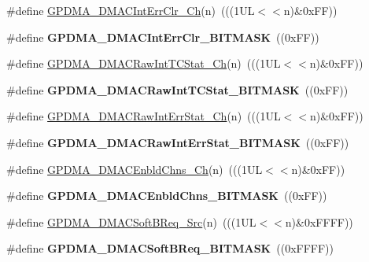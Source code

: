 \begin{DoxyCompactItemize}
\item 
\#define \hyperlink{group___g_p_d_m_a___private___macros_ga30624bd3694bbb1cb035fc6ee926cff4}{\-G\-P\-D\-M\-A\-\_\-\-D\-M\-A\-C\-Int\-Err\-Clr\-\_\-\-Ch}(n)~(((1\-U\-L$<$$<$n)\&0x\-F\-F))
\item 
\hypertarget{group___g_p_d_m_a___private___macros_gaf872c724b08d36d494e506422381452b}{\#define {\bfseries \-G\-P\-D\-M\-A\-\_\-\-D\-M\-A\-C\-Int\-Err\-Clr\-\_\-\-B\-I\-T\-M\-A\-S\-K}~((0x\-F\-F))}\label{group___g_p_d_m_a___private___macros_gaf872c724b08d36d494e506422381452b}

\item 
\#define \hyperlink{group___g_p_d_m_a___private___macros_ga5770aa4381349f0d823b0f33a6c5c03a}{\-G\-P\-D\-M\-A\-\_\-\-D\-M\-A\-C\-Raw\-Int\-T\-C\-Stat\-\_\-\-Ch}(n)~(((1\-U\-L$<$$<$n)\&0x\-F\-F))
\item 
\hypertarget{group___g_p_d_m_a___private___macros_gafc6495cc219e502bcd502711d656ecfa}{\#define {\bfseries \-G\-P\-D\-M\-A\-\_\-\-D\-M\-A\-C\-Raw\-Int\-T\-C\-Stat\-\_\-\-B\-I\-T\-M\-A\-S\-K}~((0x\-F\-F))}\label{group___g_p_d_m_a___private___macros_gafc6495cc219e502bcd502711d656ecfa}

\item 
\#define \hyperlink{group___g_p_d_m_a___private___macros_gab379459e1f2068a15b8ecf1552ef4f29}{\-G\-P\-D\-M\-A\-\_\-\-D\-M\-A\-C\-Raw\-Int\-Err\-Stat\-\_\-\-Ch}(n)~(((1\-U\-L$<$$<$n)\&0x\-F\-F))
\item 
\hypertarget{group___g_p_d_m_a___private___macros_ga4c3eb0f3d0e1293e385d67eaea51c1c7}{\#define {\bfseries \-G\-P\-D\-M\-A\-\_\-\-D\-M\-A\-C\-Raw\-Int\-Err\-Stat\-\_\-\-B\-I\-T\-M\-A\-S\-K}~((0x\-F\-F))}\label{group___g_p_d_m_a___private___macros_ga4c3eb0f3d0e1293e385d67eaea51c1c7}

\item 
\#define \hyperlink{group___g_p_d_m_a___private___macros_ga8ff59f373f6072ea503777016f3447ec}{\-G\-P\-D\-M\-A\-\_\-\-D\-M\-A\-C\-Enbld\-Chns\-\_\-\-Ch}(n)~(((1\-U\-L$<$$<$n)\&0x\-F\-F))
\item 
\hypertarget{group___g_p_d_m_a___private___macros_gac36e88eaf813a835788ff849b499ac78}{\#define {\bfseries \-G\-P\-D\-M\-A\-\_\-\-D\-M\-A\-C\-Enbld\-Chns\-\_\-\-B\-I\-T\-M\-A\-S\-K}~((0x\-F\-F))}\label{group___g_p_d_m_a___private___macros_gac36e88eaf813a835788ff849b499ac78}

\item 
\#define \hyperlink{group___g_p_d_m_a___private___macros_ga91f0f9fe8fd94bfb24d162c78e5e69b8}{\-G\-P\-D\-M\-A\-\_\-\-D\-M\-A\-C\-Soft\-B\-Req\-\_\-\-Src}(n)~(((1\-U\-L$<$$<$n)\&0x\-F\-F\-F\-F))
\item 
\hypertarget{group___g_p_d_m_a___private___macros_gaa1d2042b019d3d5f0c71a70d4b0bb9f6}{\#define {\bfseries \-G\-P\-D\-M\-A\-\_\-\-D\-M\-A\-C\-Soft\-B\-Req\-\_\-\-B\-I\-T\-M\-A\-S\-K}~((0x\-F\-F\-F\-F))}\label{group___g_p_d_m_a___private___macros_gaa1d2042b019d3d5f0c71a70d4b0bb9f6}


\end{DoxyCompactItemize}
